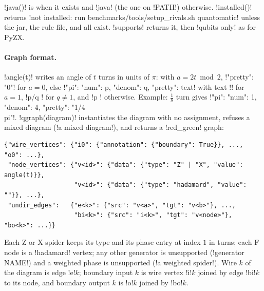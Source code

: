 \py!java()! is  when it exists and \code!java! (the one on \code!PATH!) otherwise. \py!installed()! returns \code!not installed: run benchmarks/tools/setup_rivals.sh quantomatic! unless the jar, the rule file, and  all exist. \py!supports! returns it, then \code!qubits only! as for PyZX.

\paragraph{Graph format.} \py!angle(t)! writes an angle of $t$ turns in units of $\pi$: with $a=2t\bmod2$, \py!{"pretty": "0"}! for $a=0$, else \py!{"pi": {"num": p, "denom": q}, "pretty": text}! with text \code!\pi! for $a=1$, \code!p/q \pi! for $q\neq1$, and \code!p \pi! otherwise. Example: $\tfrac18$ turn gives \code!{"pi": {"num": 1, "denom": 4}, "pretty": "1/4 \\pi"}!. \py!qgraph(diagram)! instantiates the diagram with no assignment, refuses a mixed diagram (\code!a mixed diagram!), and returns a \code!red_green! graph:
\begin{lstlisting}[style=python]
{"wire_vertices": {"i0": {"annotation": {"boundary": True}}, ..., "o0": ...},
 "node_vertices": {"v<id>": {"data": {"type": "Z" | "X", "value": angle(t)}},
                   "v<id>": {"data": {"type": "hadamard", "value": ""}}, ...},
 "undir_edges":   {"e<k>": {"src": "v<a>", "tgt": "v<b>"}, ...,
                   "bi<k>": {"src": "i<k>", "tgt": "v<node>"}, "bo<k>": ...}}
\end{lstlisting}
Each Z or X spider keeps its type and its phase entry at index $1$ in turns; each F node is a \code!hadamard! vertex; any other generator is unsupported (\code!generator NAME!) and a weighted phase is unsupported (\code!a weighted spider!). Wire $k$ of the diagram is edge \code!e!$k$; boundary input $k$ is wire vertex \code!i!$k$ joined by edge \code!bi!$k$ to its node, and boundary output $k$ is \code!o!$k$ joined by \code!bo!$k$.

